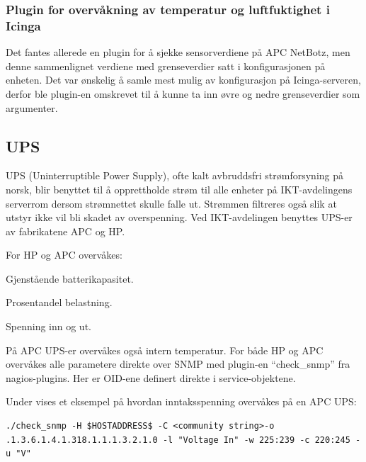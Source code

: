 \subsubsection{Plugin for overvåkning av temperatur og luftfuktighet i Icinga}
Det fantes allerede en plugin for å sjekke sensorverdiene på APC NetBotz\cite{checknetbotz}, men denne sammenlignet verdiene med grenseverdier satt i konfigurasjonen på enheten. Det var ønskelig å samle mest mulig av konfigurasjon på Icinga-serveren, derfor ble plugin-en omskrevet til å kunne ta inn øvre og nedre grenseverdier som argumenter.

\subsection{UPS}
UPS (Uninterruptible Power Supply), ofte kalt avbruddsfri strømforsyning på norsk, blir benyttet til å opprettholde strøm til alle enheter på IKT-avdelingens serverrom dersom strømnettet skulle falle ut. Strømmen filtreres også slik at utstyr ikke vil bli skadet av overspenning. Ved IKT-avdelingen benyttes UPS-er av fabrikatene APC og HP.

For HP og APC overvåkes:
\begin{itemize*}
 	\item Gjenstående batterikapasitet.
	\item Prosentandel belastning.
	\item Spenning inn og ut.
\end{itemize*}
På APC UPS-er overvåkes også intern temperatur. For både HP og APC overvåkes alle parametere direkte over SNMP med plugin-en ``check\_snmp'' fra nagios-plugins. Her er OID-ene definert direkte i service-objektene.

Under vises et eksempel på hvordan inntaksspenning overvåkes på en APC UPS:
\begin{lstlisting}[style=example]
./check_snmp -H $HOSTADDRESS$ -C <community string>-o .1.3.6.1.4.1.318.1.1.1.3.2.1.0 -l "Voltage In" -w 225:239 -c 220:245 -u "V"
\end{lstlisting}
